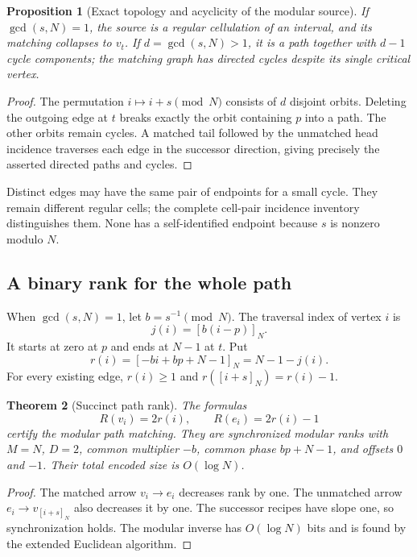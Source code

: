 \documentclass[11pt,letterpaper]{article}
\newtheorem{theorem}{Theorem}[section]
\newtheorem{proposition}[theorem]{Proposition}
\theoremstyle{definition}
\theoremstyle{remark}\newtheorem{remark}[theorem]{Remark}
\newcommand{\res}[2]{\left[#1\right]_{#2}}
\begin{document}
\begin{proposition}[Exact topology and acyclicity of the modular source]
\label{prop:path}
If $\gcd(s,N)=1$, the source is a regular cellulation of an interval, and its matching collapses to $v_t$. If $d=\gcd(s,N)>1$, it is a path together with $d-1$ cycle components; the matching graph has directed cycles despite its single critical vertex.
\end{proposition}
\begin{proof}
The permutation $i\mapsto i+s\pmod N$ consists of $d$ disjoint orbits. Deleting the outgoing edge at $t$ breaks exactly the orbit containing $p$ into a path. The other orbits remain cycles. A matched tail followed by the unmatched head incidence traverses each edge in the successor direction, giving precisely the asserted directed paths and cycles.
\end{proof}

Distinct edges may have the same pair of endpoints for a small cycle. They remain different regular cells; the complete cell-pair incidence inventory distinguishes them. None has a self-identified endpoint because $s$ is nonzero modulo $N$.

\subsection{A binary rank for the whole path}

When $\gcd(s,N)=1$, let $b=s^{-1}\pmod N$. The traversal index of vertex $i$ is
\[
                         j(i)=\res{b(i-p)}{N}.
\]
It starts at zero at $p$ and ends at $N-1$ at $t$. Put
\begin{equation}
 r(i)=\res{-bi+bp+N-1}{N}=N-1-j(i).
 \label{eq:pathres}
\end{equation}
For every existing edge, $r(i)\geq1$ and $r(\res{i+s}{N})=r(i)-1$.

\begin{theorem}[Succinct path rank]
\label{thm:pathrank}
The formulas
\[
                  R(v_i)=2r(i),\qquad R(e_i)=2r(i)-1
\]
certify the modular path matching. They are synchronized modular ranks with $M=N$, $D=2$, common multiplier $-b$, common phase $bp+N-1$, and offsets $0$ and $-1$. Their total encoded size is $O(\log N)$.
\end{theorem}
\begin{proof}
The matched arrow $v_i\to e_i$ decreases rank by one. The unmatched arrow $e_i\to v_{\res{i+s}{N}}$ also decreases it by one. The successor recipes have slope one, so synchronization holds. The modular inverse has $O(\log N)$ bits and is found by the extended Euclidean algorithm.
\end{proof}
\end{document}
